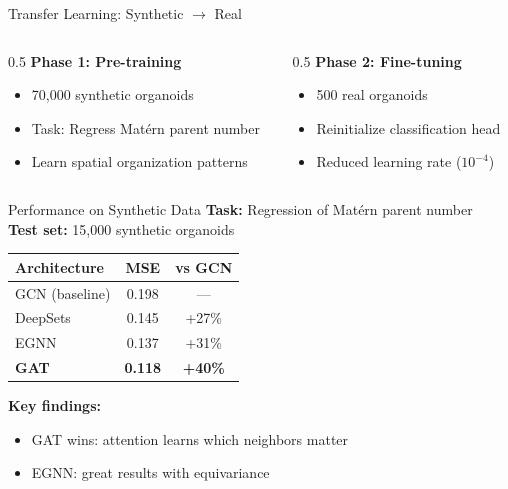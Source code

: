 \documentclass[aspectratio=169]{beamer}
\begin{document}
\begin{frame}{Transfer Learning: Synthetic $\rightarrow$ Real}
            \vspace{0.5em}
    \begin{columns}
        \begin{column}{0.5\textwidth}
            \textbf{Phase 1: Pre-training}
            \begin{itemize}
                \item 70,000 synthetic organoids
                \item Task: Regress Matérn parent number
                \item Learn spatial organization patterns
            \end{itemize}
        \end{column}
        \begin{column}{0.5\textwidth}
            \textbf{Phase 2: Fine-tuning}
            \begin{itemize}
                \item 500 real organoids
                \item Reinitialize classification head
                \item Reduced learning rate ($10^{-4}$)
            \end{itemize}
        \end{column}
    \end{columns}
\end{frame}

\begin{frame}{Performance on Synthetic Data}
    \textbf{Task:} Regression of Matérn parent number\\
    \textbf{Test set:} 15,000 synthetic organoids
    
    \vspace{0.5em}
    \begin{table}
        \centering
        \begin{tabular}{lcc}
            \toprule
            \textbf{Architecture} & \textbf{MSE} & \textbf{vs GCN} \\
            \midrule
            GCN (baseline) & 0.198 & — \\
            DeepSets & 0.145 & +27\% \\
            EGNN & 0.137 & +31\% \\
            \textbf{GAT} & \textbf{0.118} & \textbf{+40\%} \\
            \bottomrule
        \end{tabular}
    \end{table}
    
    \vspace{0.5em}
    \textbf{Key findings:}
    \begin{itemize}
        \item GAT wins: attention learns which neighbors matter
        \item EGNN: great results with equivariance
    \end{itemize}
\end{frame}
\end{document}

